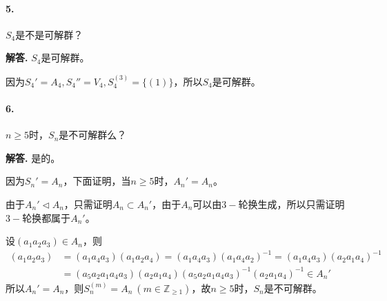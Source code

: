 \documentclass[12pt, a4paper, oneside]{ctexart}
\newenvironment{solution}{\par\noindent\textbf{解答. }}{\bigskip\par}
\begin{document}
\paragraph{5.}$S_4$是不是可解群？
\begin{solution}
    $S_4$是可解群。
    
    因为$S_4'=A_4,S_4''=V_4,S_4^{(3)}=\{(1)\}$，所以$S_4$是可解群。
\end{solution}

\paragraph{6.}$n\geqslant 5$时，$S_n$是不可解群么？
\begin{solution}
    是的。

    因为$S_n'=A_n$，下面证明，当$n\geqslant 5$时，$A_n'=A_n$。

    由于$A_n'\triangleleft A_n$，只需证明$A_n\subset A_n'$，由于$A_n$可以由$3-\text{轮换}$生成，所以只需证明$3-\text{轮换}$都属于$A_n'$。

    设$(a_1a_2a_3)\in A_n$，则
    \begin{equation*}
        \begin{aligned}
            (a_1a_2a_3) &= (a_1a_4a_3)(a_1a_2a_4) = (a_1a_4a_3)(a_1a_4a_2)^{-1} = (a_1a_4a_3)(a_2a_1a_4)^{-1}\\
            &= (a_5a_2a_1a_4a_3)(a_2a_1a_4)(a_5a_2a_1a_4a_3)^{-1}(a_2a_1a_4)^{-1}\in A_n'
        \end{aligned}
    \end{equation*}
    所以$A_n'=A_n$，则$S_n^{(m)}=A_n\ (m\in\mathbb Z_{\geqslant 1})$，故$n\geqslant 5$时，$S_n$是不可解群。
\end{solution}
\end{document}
